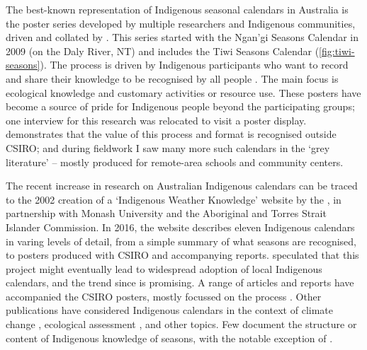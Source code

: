 The best-known representation of Indigenous seasonal calendars in Australia
is the poster series developed by multiple researchers and Indigenous
communities, driven and collated by \citet{CSIROcals}.  This series started with the
Ngan'gi Seasons Calendar in 2009 (on the Daly River, NT) and includes the Tiwi Seasons Calendar
(\cref{fig:tiwi-seasons}).  The process is driven by Indigenous participants
who want to record and share their knowledge to be recognised by all people
\citep{woodward2010,oconnor2010}.  The main focus is ecological knowledge and
customary activities or resource use.  These posters have become a source of
pride for Indigenous people beyond the participating groups; one interview
for this research was relocated to visit a poster display.  \citet{gotha2012}
demonstrates that the value of this process and format is recognised outside
CSIRO; and during fieldwork I saw many more such calendars in the `grey
literature' -- mostly produced for remote-area schools and community centers.


The recent increase in research on Australian Indigenous calendars can be
traced to the 2002 creation of a `Indigenous Weather Knowledge' website by the
\citet{BOM-iwk}, in partnership with Monash University and the Aboriginal and
Torres Strait Islander Commission.  In 2016, the website describes eleven
Indigenous calendars in varing levels of detail, from a simple summary of what
seasons are recognised, to posters produced with CSIRO and accompanying reports.
\citet{kingsley2003} speculated that this project might eventually lead
to widespread adoption of local Indigenous calendars, and the trend since is promising.
%
A range of articles and reports have accompanied the CSIRO posters, mostly
focussed on the process \citep[eg.][]{woodward2010,oconnor2010}.  Other
publications have considered Indigenous calendars in the context of
climate change \citep[eg.][]{green2010a,green2010b},
ecological assessment \citep[eg.][]{ens2012,prober2011}, and other topics.
Few document the structure or content of Indigenous knowledge of seasons, with
the notable exception of \citet[eg.][]{woodward2012b}.


